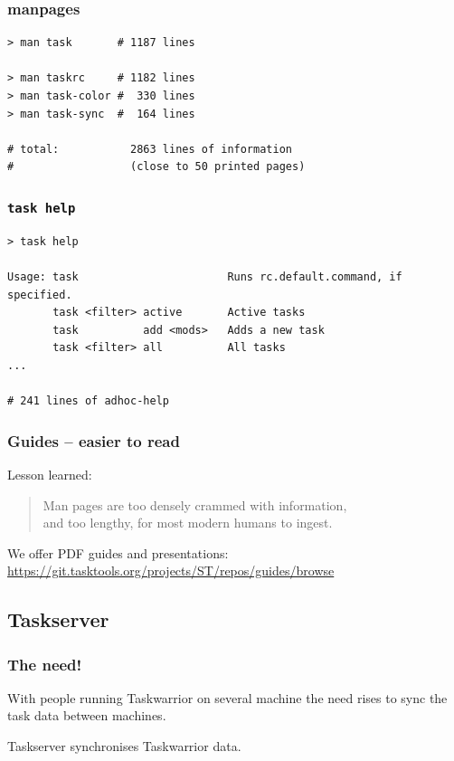 \documentclass[t,handout,aspectratio=169]{beamer}
\begin{document}
\begin{frame}[fragile]\frametitle{manpages}
    \vfill
    \begin{lstlisting}
> man task       # 1187 lines

> man taskrc     # 1182 lines
> man task-color #  330 lines
> man task-sync  #  164 lines

# total:           2863 lines of information
#                  (close to 50 printed pages)\end{lstlisting}
\end{frame}

\begin{frame}[fragile]\frametitle{\texttt{task help}}
    \vfill
    \begin{lstlisting}
> task help

Usage: task                       Runs rc.default.command, if specified.
       task <filter> active       Active tasks
       task          add <mods>   Adds a new task
       task <filter> all          All tasks
...

# 241 lines of adhoc-help\end{lstlisting}
\end{frame}

\begin{frame}[fragile]\frametitle{Guides -- easier to read}
    \vfill
    Lesson learned:
    \begin{quote}
        Man pages are too densely crammed with information, \\
        and too lengthy, for most modern humans to ingest.
    \end{quote} \pause
    We offer PDF guides and presentations: \\
    \url{https://git.tasktools.org/projects/ST/repos/guides/browse}
\end{frame}

\subsection{Taskserver}

\begin{frame}[fragile]\frametitle{The need!}
    \vfill
    With people running Taskwarrior on several machine the need rises to sync the task data between machines.
\end{frame}

\begin{frame}[standout]
    Taskserver synchronises Taskwarrior data.
\end{frame}
\end{document}
